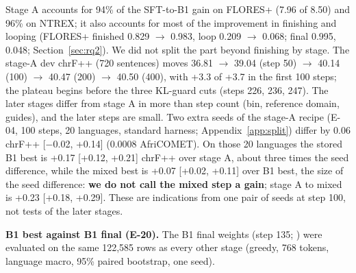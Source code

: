 
 Stage A accounts for 94\% of the SFT-to-B1 gain on FLORES+ (7.96 of 8.50) and 96\% on NTREX; it also accounts for most of the improvement in finishing and looping (FLORES+ finished 0.829 $\to$ 0.983, loop 0.209 $\to$ 0.068; final 0.995, 0.048; Section~\ref{sec:rq2}). We did not split the part beyond finishing by stage. The stage-A dev chrF++ (720 sentences) moves 36.81 $\to$ 39.04 (step 50) $\to$ 40.14 (100) $\to$ 40.47 (200) $\to$ 40.50 (400), with +3.3 of +3.7 in the first 100 steps; the plateau begins before the three KL-guard cuts (steps 226, 236, 247).  The later stages differ from stage A in more than step count (bin, reference domain, guides), and the later steps are small. Two extra seeds of the stage-A recipe (E-04, 100 steps, 20 languages, standard harness; Appendix~\ref{app:split}) differ by 0.06 chrF++ [\ensuremath{-}0.02, +0.14] (0.0008 AfriCOMET). On those 20 languages the stored B1 best is +0.17 [+0.12, +0.21] chrF++ over stage A, about three times the seed difference, while the mixed best is +0.07 [+0.02, +0.11] over B1 best, the size of the seed difference: \textbf{we do not call the mixed step a gain}; stage A to mixed is +0.23 [+0.18, +0.29]. These are indications from one pair of seeds at step 100, not tests of the later stages. 

\textbf{B1 best against B1 final (E-20).} The B1 final weights (step 135; ) were evaluated on the same 122,585 rows as every other stage (greedy, 768 tokens, language macro, 95\% paired bootstrap, one seed). 

